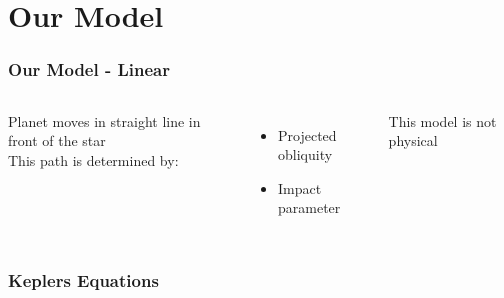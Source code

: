 \documentclass[show notes]{beamer}
\begin{document}
\begin{frame}
\frametitle{}

\end{frame}

\section{Our Model}

\begin{frame}
\frametitle{Our Model - Linear}
\begin{columns}
		Planet moves in straight line in front of the star\\
		
		This path is determined by:
		\begin{itemize}
			\item Projected obliquity
			\item Impact parameter
		\end{itemize}
		
		This model is not physical
		

\end{columns}
\end{frame}


\begin{frame}
\frametitle{Keplers Equations}	
	
\end{frame}
\end{document}
